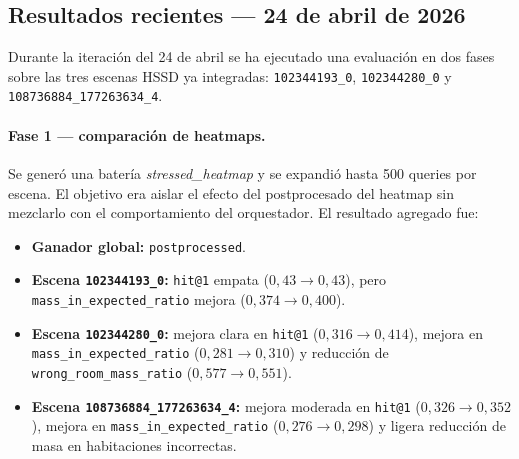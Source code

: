 \documentclass[11pt,a4paper]{article}
\begin{document}
\subsection{Resultados recientes --- 24 de abril de 2026}

Durante la iteración del 24 de abril se ha ejecutado una evaluación en dos
fases sobre las tres escenas HSSD ya integradas:
\texttt{102344193\_0}, \texttt{102344280\_0} y
\texttt{108736884\_177263634\_4}.

\paragraph{Fase 1 --- comparación de heatmaps.} Se generó una batería
\emph{stressed\_heatmap} y se expandió hasta 500 queries por escena. El
objetivo era aislar el efecto del postprocesado del heatmap sin mezclarlo con
el comportamiento del orquestador. El resultado agregado fue:

\begin{itemize}
  \item \textbf{Ganador global:} \texttt{postprocessed}.
  \item \textbf{Escena \texttt{102344193\_0}:}
        \texttt{hit@1} empata ($0{,}43 \rightarrow 0{,}43$), pero
        \texttt{mass\_in\_expected\_ratio} mejora
        ($0{,}374 \rightarrow 0{,}400$).
  \item \textbf{Escena \texttt{102344280\_0}:}
        mejora clara en \texttt{hit@1}
        ($0{,}316 \rightarrow 0{,}414$),
        mejora en \texttt{mass\_in\_expected\_ratio}
        ($0{,}281 \rightarrow 0{,}310$) y reducción de
        \texttt{wrong\_room\_mass\_ratio}
        ($0{,}577 \rightarrow 0{,}551$).
  \item \textbf{Escena \texttt{108736884\_177263634\_4}:}
        mejora moderada en \texttt{hit@1}
        ($0{,}326 \rightarrow 0{,}352$),
        mejora en \texttt{mass\_in\_expected\_ratio}
        ($0{,}276 \rightarrow 0{,}298$) y ligera reducción de masa en
        habitaciones incorrectas.
\end{itemize}
\end{document}
